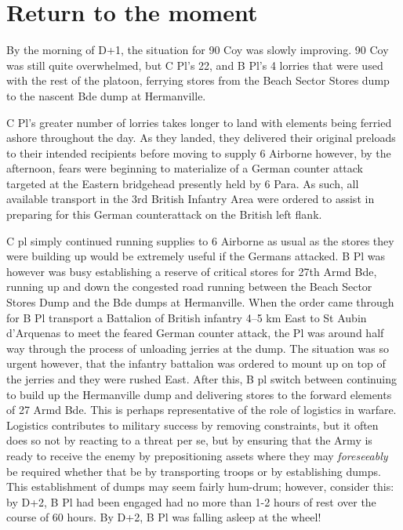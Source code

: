 \documentclass[noraggedright]{turabian-researchpaper}
\begin{document}

\section{Return to the moment} %

By the morning of D+1, the situation for 90 Coy was slowly improving.  90 Coy 
was still quite overwhelmed, but C Pl's 22, and B Pl's 4 lorries that were used
with the rest of the platoon, ferrying stores from the Beach Sector Stores 
dump to the nascent Bde dump at Hermanville.  

C Pl's greater number of lorries takes longer to land with elements being 
ferried ashore throughout the day.  As they landed, they delivered their
original preloads to their intended recipients before moving to supply 
6 Airborne however, by the afternoon, fears were beginning to materialize of
a German counter attack targeted at the Eastern bridgehead presently held by
6 Para.  As such, all available transport in the 3rd British Infantry Area
were ordered to assist in preparing for this German counterattack on the 
British left flank.  

C pl simply continued running supplies to 6 Airborne
as usual as the stores they were building up would be extremely useful if
the Germans attacked.   B Pl was however was busy establishing a reserve of 
critical stores for 27th Armd Bde, running up and down the congested road 
running between the Beach Sector Stores Dump and the Bde dumps at Hermanville.
When the order came through for B Pl transport a Battalion of British infantry
4--5 km East to St Aubin d'Arquenas to meet the feared German counter 
attack, the Pl was around half way through the process of unloading jerries 
at the dump.  The situation was so urgent however, that the infantry battalion
was ordered to mount up on top of the jerries and they were rushed East.  After
this, B pl switch between continuing to build up the Hermanville dump and 
delivering stores to the forward elements of 27 Armd Bde.  This is perhaps 
representative of the role of logistics in warfare.  Logistics contributes to
military success by removing constraints, but it often does so not by reacting
to a threat per se, but by ensuring that the Army is ready to receive the 
enemy by prepositioning assets where they may \textit{foreseeably} be 
required whether that be by transporting troops or by establishing dumps.  
This establishment of dumps may seem fairly hum-drum; however, consider this:
by D+2, B Pl had been engaged had no more than 1-2 hours of rest over the 
course of 60 hours.  By D+2, B Pl was falling asleep at the wheel!  
\end{document}
